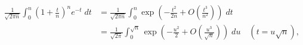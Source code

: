 \begin{align*}
\frac{1}{\sqrt{2\pi n}} \int_{0}^{n} \left(1+\frac{t}{n}\right)^{n}e^{-t}\;dt
&= \frac{1}{\sqrt{2\pi n}} \int_{0}^{n} \exp \left(-\frac{t^2}{2n} + O\left(\frac{t^3}{n^2}\right)\right)\;dt \\
&= \frac{1}{\sqrt{2\pi}} \int_{0}^{\sqrt{n}} \exp \left(-\frac{u^2}{2} + O\left(\frac{u^3}{\sqrt{n}}\right)\right)\;du \quad (t = u\sqrt{n}),
\end{align*}